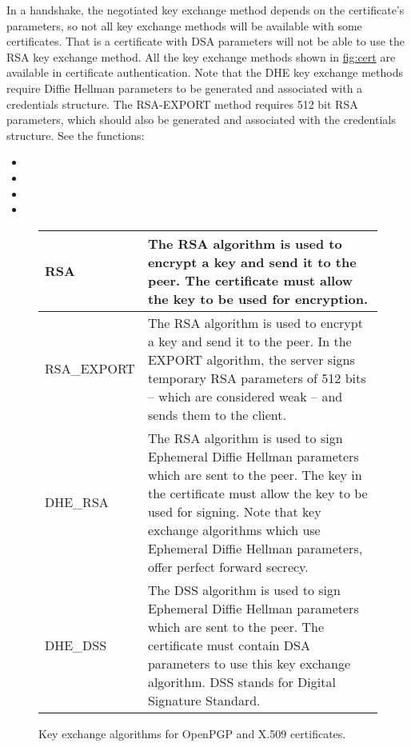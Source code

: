 \par
In a handshake, the negotiated key exchange method depends on the 
certificate's parameters, so not all key exchange methods will be available
with some certificates. That is a certificate with DSA parameters will not
be able to use the RSA key exchange method.
All the key exchange methods shown in \hyperref{figure}{figure }{}{fig:cert} are
available in certificate authentication. 
Note that the DHE key exchange methods require Diffie Hellman parameters
to be generated and associated with a credentials structure. The RSA-EXPORT
method requires 512 bit RSA parameters, which should also be generated
and associated with the credentials structure. See the functions:
\begin{itemize}
\item {}
\item {}
\item {}
\item {}
\end{itemize}

\begin{figure}[hbtp]
\begin{tabular}{|l|p{9cm}|}
\hline
RSA & The RSA algorithm is used to encrypt a key and send it to the peer.
The certificate must allow the key to be used for encryption.
\\
\hline
RSA\_EXPORT & The RSA algorithm is used to encrypt a key and send it to the peer.
In the EXPORT algorithm, the server signs temporary RSA parameters of 512
bits -- which are considered weak -- and sends them to the client.
\\
\hline
DHE\_RSA & The RSA algorithm is used to sign Ephemeral Diffie Hellman
parameters which are sent to the peer. The key in the certificate must allow
the key to be used for signing. Note that key exchange algorithms which use
Ephemeral Diffie Hellman parameters, offer perfect forward secrecy.
\\
\hline
DHE\_DSS & The DSS algorithm is used to sign Ephemeral Diffie Hellman
parameters which are sent to the peer. The certificate must contain DSA
parameters to use this key exchange algorithm. DSS stands for Digital Signature
Standard.
\\
\hline
\end{tabular}

\caption{Key exchange algorithms for OpenPGP and X.509 certificates.}
\label{fig:cert}

\end{figure}


